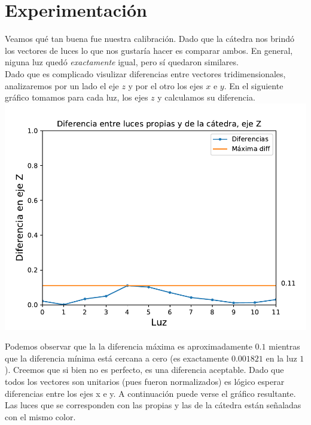 \section{Experimentación}




Veamos qué tan buena fue nuestra calibración. Dado que la cátedra nos brindó los vectores de luces lo que nos gustaría hacer es comparar ambos. En general, niguna luz quedó \textit{exactamente} igual, pero sí quedaron similares. \\

Dado que es complicado visulizar diferencias entre vectores tridimensionales, analizaremos por un lado el eje $z$ y por el otro los ejes $x$ e $y$. En el siguiente gráfico tomamos para cada luz, los ejes $z$ y calculamos su diferencia. \\

{\centering
    \includegraphics[scale=0.7]{informe/imagenes/lucesEjezDiferencias.pdf} \\
}

Podemos observar que la la diferencia máxima es aproximadamente $0.1$ mientras que la diferencia mínima está cercana a cero (es exactamente $0.001821$ en la luz $1$). Creemos que si bien no es perfecto, es una diferencia aceptable. Dado que todos los vectores son unitarios (pues fueron normalizados) es lógico esperar diferencias entre los ejes x e y. A continuación puede verse el gráfico resultante. Las luces que se corresponden con las propias y las de la cátedra están señaladas con el mismo color. \\

